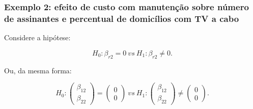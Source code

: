 \documentclass[10pt,
  aspectratio=169,
  serif,
  mathserif,
  professionalfont,
  compress,
  handout,
  ]{beamer}\usepackage[]{graphicx}\usepackage[]{color}
\begin{document}

\begin{frame}

\frametitle{Exemplo 2: efeito de custo com manutenção sobre número\\ de assinantes e percentual de domicílios com TV a cabo}

Considere a hipótese:

$$H_0: \beta_{r2} = 0 \ vs \ H_1: \beta_{r2} \neq 0.$$ 

Ou, da mesma forma:

$$H_0: 
\begin{pmatrix}
\beta_{12} \\ 
\beta_{22}
\end{pmatrix} 
= 
\begin{pmatrix}
0 \\ 
0
\end{pmatrix}
\ vs \ 
H_1: 
\begin{pmatrix}
\beta_{12} \\ 
\beta_{22}
\end{pmatrix} 
\neq
\begin{pmatrix}
0 \\ 
0 
\end{pmatrix}.$$

\end{frame}

\end{document}
